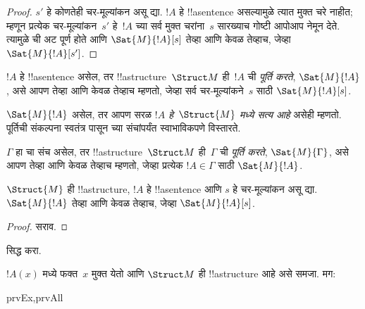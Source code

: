 \documentclass[../../../include/open-logic-section]{subfiles}
\begin{document}
\begin{proof}
  $s'$ हे कोणतेही चर-मूल्यांकन असू द्या. $!A$ हे !!a{sentence}
  असल्यामुळे त्यात मुक्त चरे नाहीत; म्हणून प्रत्येक चर-मूल्यांकन~$s'$
  हे~$!A$ च्या सर्व मुक्त चरांना~$s$ सारख्याच गोष्टी आपोआप नेमून देते.
  त्यामुळे  ची अट पूर्ण होते आणि
  $\Sat{M}{!A}[s]$ तेव्हा आणि केवळ तेव्हाच, जेव्हा
  $\Sat{M}{!A}[s']$.
\end{proof}

\begin{defn}
$!A$ हे !!a{sentence} असेल, तर !!a{structure}~$\Struct M$ ही~$!A$ ची
\emph{पूर्ति करते}, $\Sat{M}{!A}$, असे आपण तेव्हा आणि केवळ तेव्हाच
म्हणतो, जेव्हा सर्व चर-मूल्यांकने~$s$ साठी $\Sat{M}{!A}[s]$.
\end{defn}

$\Sat{M}{!A}$ असेल, तर आपण सरळ \emph{$!A$ हे~$\Struct{M}$ मध्ये सत्य
आहे} असेही म्हणतो. पूर्तिची संकल्पना स्वतंत्र पासून
च्या संचांपर्यंत स्वाभाविकपणे विस्तारते.

\begin{defn}
$\Gamma$ हा चा संच असेल, तर !!a{structure}~$\Struct M$
ही~$\Gamma$ ची \emph{पूर्ति करते}, $\Sat{M}{\Gamma}$, असे आपण तेव्हा
आणि केवळ तेव्हाच म्हणतो, जेव्हा प्रत्येक $!A \in \Gamma$ साठी
$\Sat{M}{!A}$.
%
\end{defn}

\begin{prop}
  $\Struct{M}$ ही !!a{structure}, $!A$ हे !!a{sentence} आणि $s$ हे
  चर-मूल्यांकन असू द्या. $\Sat{M}{!A}$ तेव्हा आणि केवळ तेव्हाच,
  जेव्हा $\Sat{M}{!A}[s]$.
\end{prop}

\begin{proof}
सराव.
\end{proof}

\begin{prob}
 सिद्ध करा.
\end{prob}

\begin{prop}
  $!A(x)$ मध्ये फक्त~$x$ मुक्त येतो आणि $\Struct M$ ही
  !!a{structure} आहे असे समजा. मग:
  \begin{tagenumerate}{prvEx,prvAll}
\end{tagenumerate}
\end{prop}
\end{document}
